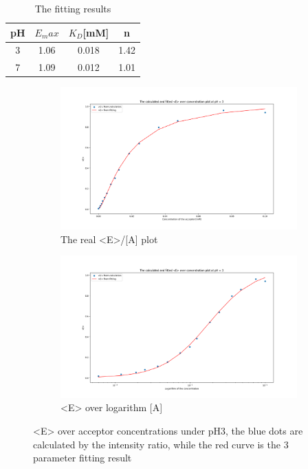 \documentclass[a4paper,english,12pt,bibliography=totoc]{scrreprt}
\begin{document}
\begin{table}[hbpt]
    \centering
    \begin{tabular}{c|c|c|c}
        \hline
      pH &$E_max$ & $K_D$[mM]&n\\
         \hline
      3   & 1.06 &0.018& 1.42\\
         \hline
       7  & 1.09 &0.012 & 1.01\\
       \hline
    \end{tabular}
    \caption{The fitting results}
    \label{tab:my_label}
\end{table}


\begin{figure}[htbp]
    \centering
    \begin{subfigure}[b]{0.45\textwidth}
        \includegraphics[width=\textwidth]{Figures/E_mean_ph3.png}
        \caption{The real <E>/[A] plot}
    \end{subfigure}
    \quad %
    \begin{subfigure}[b]{0.45\textwidth}
        \includegraphics[width=\textwidth]{Figures/Log_e_mean_ph3.png}
        \caption{<E> over logarithm [A]}
    \end{subfigure}
    \caption{<E> over acceptor concentrations under pH3, the blue dots are calculated by the intensity ratio, while the red curve is the 3 parameter fitting result}
\end{figure}
\end{document}
